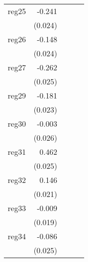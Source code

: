 {\begin{longtable}{l*{4}{D{.}{.}{-1}}}
\addlinespace
reg25       &      -0.241\sym{***}&                     &                     &                     \\
            &     (0.024)         &                     &                     &                     \\
\addlinespace
reg26       &      -0.148\sym{***}&                     &                     &                     \\
            &     (0.024)         &                     &                     &                     \\
\addlinespace
reg27       &      -0.262\sym{***}&                     &                     &                     \\
            &     (0.025)         &                     &                     &                     \\
\addlinespace
reg29       &      -0.181\sym{***}&                     &                     &                     \\
            &     (0.023)         &                     &                     &                     \\
\addlinespace
reg30       &      -0.003         &                     &                     &                     \\
            &     (0.026)         &                     &                     &                     \\
\addlinespace
reg31       &       0.462\sym{***}&                     &                     &                     \\
            &     (0.025)         &                     &                     &                     \\
\addlinespace
reg32       &       0.146\sym{***}&                     &                     &                     \\
            &     (0.021)         &                     &                     &                     \\
\addlinespace
reg33       &      -0.009         &                     &                     &                     \\
            &     (0.019)         &                     &                     &                     \\
\addlinespace
reg34       &      -0.086\sym{***}&                     &                     &                     \\
            &     (0.025)         &                     &                     &                     \\

\end{longtable}}
